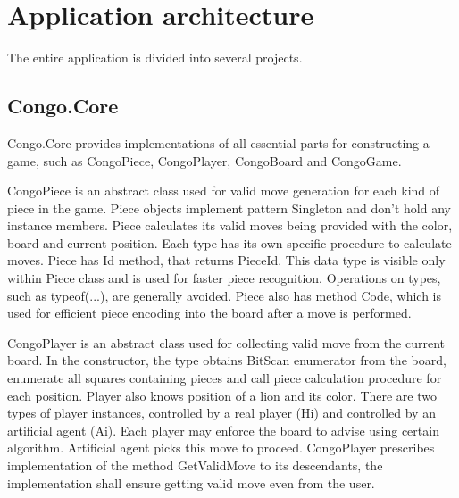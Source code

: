 \section{Application architecture}

The entire application is divided into several projects.

\subsection{Congo.Core}

\textsf{Congo.Core} provides implementations of all essential parts for
constructing a game, such as \textsf{CongoPiece}, \textsf{CongoPlayer},
\textsf{CongoBoard} and \textsf{CongoGame}.

\vspace{0.5em}

\textsf{CongoPiece} is an abstract class used for valid move generation for
each kind of piece in the game. Piece objects implement pattern
\textsf{Singleton} and don't hold any instance members. Piece calculates its
valid moves being provided with the color, board and current position. Each
type has its own specific procedure to calculate moves. Piece has
\textsf{Id} method, that returns \textsf{PieceId}. This data type is visible
only within Piece class and is used for faster piece recognition. Operations
on types, such as \textsf{typeof(...)}, are generally avoided. Piece also has
method \textsf{Code}, which is used for efficient piece encoding into the board
after a move is performed.

\vspace{0.5em}

\textsf{CongoPlayer} is an abstract class used for collecting valid move from
the current board. In the constructor, the type obtains \textsf{BitScan}
enumerator from the board, enumerate all squares containing pieces and call
piece calculation procedure for each position. Player also knows position of a
lion and its color. There are two types of player instances, controlled by a
real player (Hi) and controlled by an artificial agent (Ai). Each player may
enforce the board to advise using certain algorithm. Artificial agent picks
this move to proceed. \textsf{CongoPlayer} prescribes implementation of the
method \textsf{GetValidMove} to its descendants, the implementation shall
ensure getting valid move even from the user.

\vspace{0.5em}


